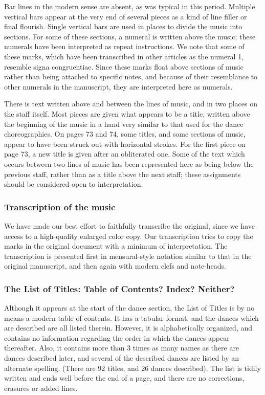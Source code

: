 \documentclass[12pt,letter]{article} %
\begin{document}
Bar lines in the modern sense are absent, as was typical in this period.  Multiple vertical bars appear at the very end of several pieces as a kind of line filler or final flourish.  Single vertical bars are used in places to divide the music into sections.  For some of these sections, a numeral is written above the music; these numerals have been interpreted as repeat instructions.  We note that some of these marks, which have been transcribed in other articles as the numeral 1, resemble signa congruentiae.   Since these marks float above sections of music rather than being attached to specific notes, and because of their resemblance to other numerals in the manuscript, they are interpreted here as numerals. 

There is text written above and between the lines of music, and in two places on the staff itself.  Most pieces are given what appears to be a title, written above the beginning of the music in a hand very similar to that used for the dance choreographies.  On pages 73 and 74, some titles, and some sections of music, appear to have been struck out with horizontal strokes.  For the first piece on page 73, a new title is given after an obliterated one.  Some of the text which occurs between two lines of music has been represented here as being below the previous staff, rather than as a title above the next staff; these assignments should be considered open to interpretation.  

\subsubsection{Transcription of the music}

We have made our best effort to faithfully transcribe the original, since we have access to a high-quality enlarged color copy.  Our transcription tries to copy the marks in the original document with a minimum of interpretation. The transcription is presented first in mensural-style notation similar to that in the original manuscript, and then again with modern clefs and note-heads.

\subsubsection{The List of Titles: Table of Contents? Index? Neither?}
Although it appears at the start of the dance section, the List of Titles is by no means a modern table of contents. It has a tabular format, and the dances which are described are all listed therein. However, it is alphabetically organized, and contains no information regarding the order in which the dances appear thereafter. Also, it contains more than 3 times as many names as there are dances described later, and several of the described dances are listed by an alternate spelling. (There are 92 titles, and 26 dances described). The list is tidily written and ends well before the end of a page, and there are no corrections, erasures or added lines.  
\end{document}
